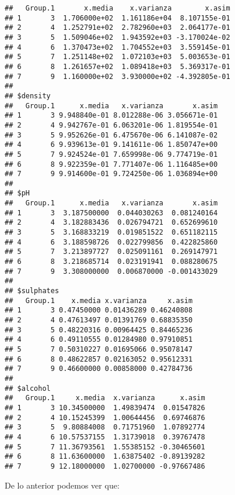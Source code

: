 \documentclass[
]{article}
\begin{document}
\begin{verbatim}
##   Group.1       x.media    x.varianza        x.asim
## 1       3  1.706000e+02  1.161186e+04  8.107155e-01
## 2       4  1.252791e+02  2.782960e+03  2.064177e-01
## 3       5  1.509046e+02  1.943592e+03 -3.170024e-02
## 4       6  1.370473e+02  1.704552e+03  3.559145e-01
## 5       7  1.251148e+02  1.072103e+03  5.003653e-01
## 6       8  1.261657e+02  1.089418e+03  5.369317e-01
## 7       9  1.160000e+02  3.930000e+02 -4.392805e-01
## 
## $density
##   Group.1      x.media   x.varianza       x.asim
## 1       3 9.948840e-01 8.012288e-06 3.056671e-01
## 2       4 9.942767e-01 6.063201e-06 1.819554e-01
## 3       5 9.952626e-01 6.475670e-06 6.141087e-02
## 4       6 9.939613e-01 9.141611e-06 1.850747e+00
## 5       7 9.924524e-01 7.659998e-06 9.774719e-01
## 6       8 9.922359e-01 7.771407e-06 1.116485e+00
## 7       9 9.914600e-01 9.724250e-06 1.036894e+00
## 
## $pH
##   Group.1      x.media   x.varianza       x.asim
## 1       3  3.187500000  0.044030263  0.081240164
## 2       4  3.182883436  0.026794721  0.652699610
## 3       5  3.168833219  0.019851522  0.651182115
## 4       6  3.188598726  0.022799856  0.422825860
## 5       7  3.213897727  0.025091161  0.269147971
## 6       8  3.218685714  0.023191941  0.088280675
## 7       9  3.308000000  0.006870000 -0.001433029
## 
## $sulphates
##   Group.1    x.media x.varianza     x.asim
## 1       3 0.47450000 0.01436289 0.46240808
## 2       4 0.47613497 0.01391769 0.68835350
## 3       5 0.48220316 0.00964425 0.84465236
## 4       6 0.49110555 0.01284980 0.97910851
## 5       7 0.50310227 0.01695066 0.95078147
## 6       8 0.48622857 0.02163052 0.95612331
## 7       9 0.46600000 0.00858000 0.42784736
## 
## $alcohol
##   Group.1     x.media  x.varianza      x.asim
## 1       3 10.34500000  1.49839474  0.01547826
## 2       4 10.15245399  1.00644456  0.69746876
## 3       5  9.80884008  0.71751960  1.07892774
## 4       6 10.57537155  1.31739018  0.39767478
## 5       7 11.36793561  1.55385152 -0.30465601
## 6       8 11.63600000  1.63875402 -0.89139282
## 7       9 12.18000000  1.02700000 -0.97667486
\end{verbatim}

De lo anterior podemos ver que:
\end{document}
